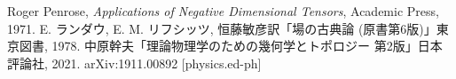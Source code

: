 \documentclass[dvipdfmx]{jsarticle}
\begin{document}
\tableofcontents

\pagebreak



\pagebreak



\pagebreak



\pagebreak



\pagebreak

\appendix



\begin{thebibliography}{2}
     Roger Penrose, \textit{Applications of Negative Dimensional Tensors}, Academic Press, 1971.
     E. ランダウ, E. M. リフシッツ, 恒藤敏彦訳「場の古典論 (原書第6版)」東京図書, 1978.
     中原幹夫「理論物理学のための幾何学とトポロジー 第2版」日本評論社, 2021.
     arXiv:1911.00892 [physics.ed-ph]
\end{thebibliography}
\end{document}
